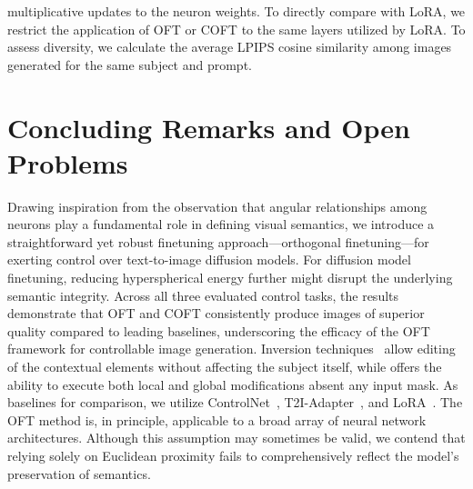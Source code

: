 \begin{itemize}[leftmargin=*,nosep]
multiplicative updates to the neuron weights. To directly compare with LoRA, we restrict the application of OFT or COFT to the same layers utilized by LoRA. To assess diversity, we calculate the average LPIPS cosine similarity among images generated for the same subject and prompt. \section{Concluding Remarks and Open Problems}

Drawing inspiration from the observation that angular relationships among neurons play a fundamental role in defining visual semantics, we introduce a straightforward yet robust finetuning approach—orthogonal finetuning—for exerting control over text-to-image diffusion models. For diffusion model finetuning, reducing hyperspherical energy further might disrupt the underlying semantic integrity. Across all three evaluated control tasks, the results demonstrate that OFT and COFT consistently produce images of superior quality compared to leading baselines, underscoring the efficacy of the OFT framework for controllable image generation. Inversion techniques~\cite{choi2021ilvr,dhariwal2021diffusion,ramesh2022hierarchical,gal2022image} allow editing of the contextual elements without affecting the subject itself, while \cite{hertz2022prompt} offers the ability to execute both local and global modifications absent any input mask. As baselines for comparison, we utilize ControlNet~\cite{zhang2023adding}, T2I-Adapter~\cite{mou2023t2i}, and LoRA~\cite{hulora2022}. The OFT method is, in principle, applicable to a broad array of neural network architectures. Although this assumption may sometimes be valid, we contend that relying solely on Euclidean proximity fails to comprehensively reflect the model’s preservation of semantics. 
\begin{abstract}

\end{abstract}
\end{itemize}
